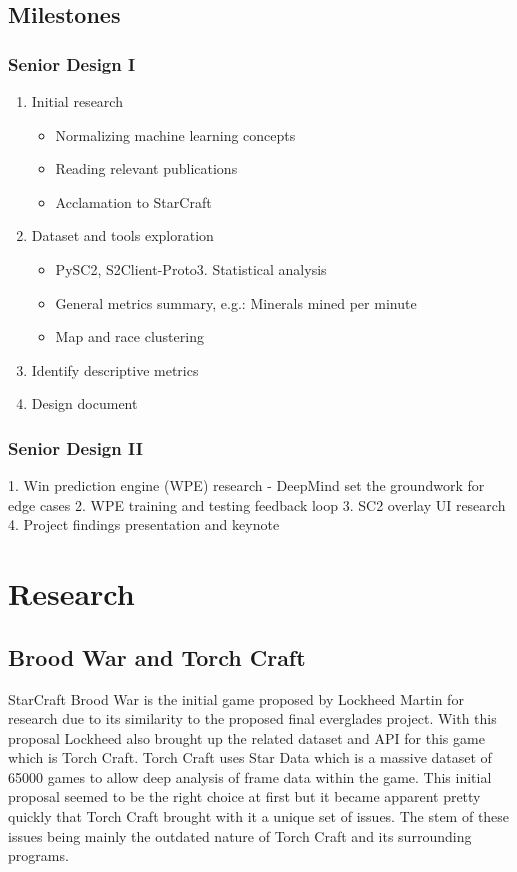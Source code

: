 \documentclass[a4paper,12pt]{report}
\begin{document}
\section{Milestones}
\subsection{Senior Design I}

\begin{enumerate}
    \item Initial research
    \begin{itemize}
        \item Normalizing machine learning concepts
        \item Reading relevant publications
        \item Acclamation to StarCraft
    \end{itemize}
    \item Dataset and tools exploration
    \begin{itemize}
        \item PySC2, S2Client-Proto3. Statistical analysis
        \item General metrics summary, e.g.: Minerals mined per minute
        \item Map and race clustering
    \end{itemize}
    \item Identify descriptive metrics
    \item Design document
\end{enumerate}

\subsection{Senior Design II}

1. Win prediction engine (WPE) research
- DeepMind set the groundwork for edge cases
2. WPE training and testing feedback loop
3. SC2 overlay UI research
4. Project findings presentation and keynote

\chapter{Research}
\section{Brood War and Torch Craft}

StarCraft Brood War is the initial game proposed by Lockheed Martin for research due to its similarity to the proposed final everglades project. With this proposal Lockheed also brought up the related dataset and API for this game which is Torch Craft. Torch Craft uses Star Data which is a massive dataset of 65000 games to allow deep analysis of frame data within the game. This initial proposal seemed to be the right choice at first but it became apparent pretty quickly that Torch Craft brought with it a unique set of issues. The stem of these issues being mainly the outdated nature of Torch Craft and its surrounding programs.
\end{document}
